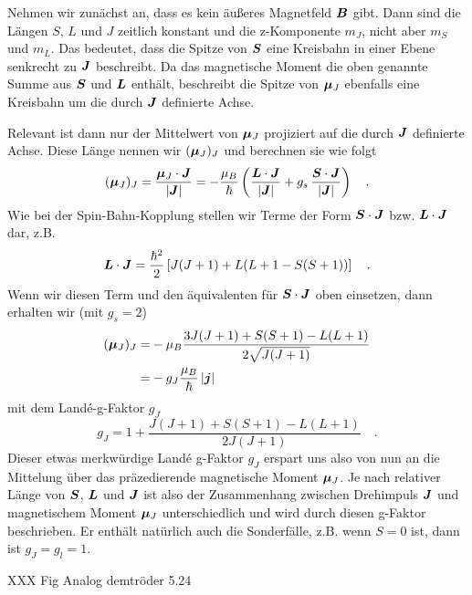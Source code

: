 Nehmen wir zunächst an, dass es kein äußeres Magnetfeld $\boldsymbol{B}$ gibt. Dann sind die Längen $S$, $L$ und $J$ zeitlich konstant und die z-Komponente  $m_J$, nicht aber $m_S$ und $m_L$. Das bedeutet, dass die Spitze von $\boldsymbol{S}$ eine Kreisbahn in einer Ebene senkrecht zu $\boldsymbol{J}$ beschreibt. Da das magnetische Moment die oben genannte Summe aus $\boldsymbol{S}$ und $\boldsymbol{L}$ enthält, beschreibt die Spitze von $\boldsymbol{\mu}_J$ ebenfalls eine Kreisbahn um die durch $\boldsymbol{J}$ definierte Achse.

Relevant ist dann nur der Mittelwert von  $\boldsymbol{\mu}_J $ projiziert auf die durch $\boldsymbol{J}$ definierte Achse.  Diese Länge nennen wir $(\boldsymbol{\mu}_J)_J$ und berechnen sie wie folgt
\begin{equation}
    (\boldsymbol{\mu}_J)_J = \frac{\boldsymbol{\mu}_J \cdot \boldsymbol{J}}{|\boldsymbol{J}|}
    = - \frac{\mu_B}{\hbar} \left(
        \frac{\boldsymbol{L} \cdot \boldsymbol{J}}{|\boldsymbol{J}|}
        +  g_s \,\frac{\boldsymbol{S} \cdot \boldsymbol{J}}{|\boldsymbol{J}|}
    \right)  \quad .
\end{equation}
Wie bei der Spin-Bahn-Kopplung stellen wir Terme der Form $\boldsymbol{S} \cdot \boldsymbol{J}$ bzw. $\boldsymbol{L} \cdot \boldsymbol{J}$  dar, z.B.
\begin{equation}
    \boldsymbol{L} \cdot \boldsymbol{J} = \frac{\hbar^2}{2}
    \left[
  J (J+1) + L(L+1 - S(S+1))
    \right]  \quad .
\end{equation}
Wenn wir diesen Term und den äquivalenten für  $\boldsymbol{S} \cdot \boldsymbol{J}$  oben einsetzen, dann erhalten wir (mit $g_s = 2$)
\begin{align}
    (\boldsymbol{\mu}_J)_J = & - \mu_B \frac{3 J (J+1)+ S(S+1) - L(L+1)}{2 \sqrt{J (J+1)}} \\
    = & - g_J \frac{\mu_B}{\hbar} \, |\boldsymbol{j}|
\end{align}
mit dem Landé-g-Faktor $g_J$ 
\begin{equation}
    g_J = 1 + \frac{J (J+1)+ S(S+1) - L(L+1)}{2 J (J+1)}   \quad .
\end{equation}
Dieser etwas merkwürdige Landé g-Faktor $g_J$ erspart uns also von nun an die Mittelung über das präzedierende magnetische Moment $\boldsymbol{\mu}_J$. Je nach relativer Länge von $\boldsymbol{S}$, $\boldsymbol{L}$ und $\boldsymbol{J}$ ist also der Zusammenhang zwischen Drehimpuls $\boldsymbol{J}$ und magnetischem Moment $\boldsymbol{\mu}_J$ unterschiedlich und wird durch diesen g-Faktor beschrieben. Er enthält natürlich auch die Sonderfälle, z.B. wenn $S=0$ ist, dann ist $g_J = g_l = 1$.


\begin{marginfigure}
    \caption{ XXX  Fig Analog demtröder 5.24 }
\end{marginfigure}


